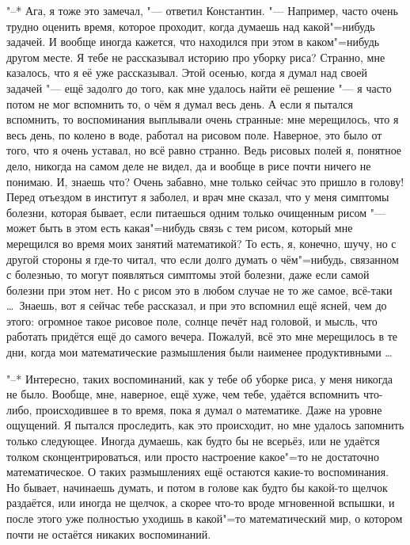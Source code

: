 "--* Ага, я тоже это замечал, "--- ответил Константин.
"--- Например, часто очень трудно оценить время, которое проходит, когда думаешь
над какой"=нибудь задачей.
И вообще иногда кажется, что находился при этом в каком"=нибудь другом месте.
Я тебе не рассказывал историю про уборку риса?
Странно, мне казалось, что я её уже рассказывал.
Этой осенью, когда я думал над своей задачей "--- ещё задолго до того, как мне
удалось найти её решение "--- я часто потом не мог вспомнить то, о чём я думал
весь день.
А если я пытался вспомнить, то воспоминания выплывали очень странные: мне
мерещилось, что я весь день, по колено в воде, работал на рисовом поле.
Наверное, это было от того, что я очень уставал, но всё равно странно.
Ведь рисовых полей я, понятное дело, никогда на самом деле не видел, да и вообще
в рисе почти ничего не понимаю.
И, знаешь что?
Очень забавно, мне только сейчас это пришло в голову!
Перед отъездом в институт я заболел, и врач мне сказал, что у меня симптомы
болезни, которая бывает, если питаешься одним только очищенным рисом "--- может
быть в этом есть какая"=нибудь связь с тем рисом, который мне мерещился во время
моих занятий математикой?
То есть, я, конечно, шучу, но с другой стороны я где-то читал, что если долго
думать о чём"=нибудь, связанном с болезнью, то могут появляться симптомы этой
болезни, даже если самой болезни при этом нет.
Но с рисом это в любом случае не то же самое, всё-таки \ldots\
Знаешь, вот я сейчас тебе рассказал, и при это вспомнил ещё ясней, чем до этого:
огромное такое рисовое поле, солнце печёт над головой, и мысль, что работать
придётся ещё до самого вечера.
Пожалуй, всё это мне мерещилось в те дни, когда мои математические размышления
были наименее продуктивными \ldots

"--* Интересно, таких воспоминаний, как у тебе об уборке риса, у меня никогда не
было.
Вообще, мне, наверное, ещё хуже, чем тебе, удаётся вспомнить что-либо,
происходившее в то время, пока я думал о математике.
Даже на уровне ощущений.
Я пытался проследить, как это происходит, но мне удалось запомнить только
следующее.
Иногда думаешь, как будто бы не всерьёз, или не удаётся толком
сконцентрироваться, или просто настроение какое"=то не достаточно
математическое.
О таких размышлениях ещё остаются какие-то воспоминания.
Но бывает, начинаешь думать, и потом в голове как будто бы какой-то щелчок
раздаётся, или иногда не щелчок, а скорее что-то вроде мгновенной вспышки, и
после этого уже полностью уходишь в какой"=то математический мир, о котором
почти не остаётся никаких воспоминаний.

